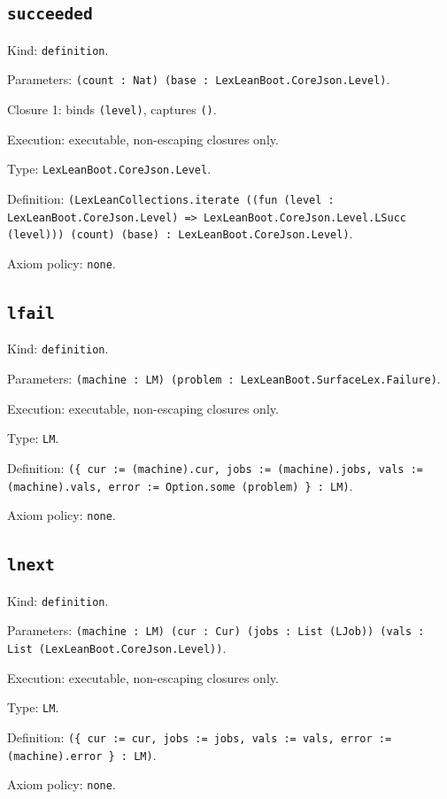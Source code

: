 \documentclass[11pt]{article}
\begin{document}
\subsection*{\texttt{succeeded}}
\noindent Kind: \texttt{definition}.\par
\noindent Parameters: \texttt{(count : Nat) (base : LexLeanBoot.CoreJson.Level)}.\par
\noindent Closure 1: binds \texttt{(level)}, captures \texttt{()}.\par
\noindent Execution: executable, non-escaping closures only.\par
\noindent Type: \texttt{LexLeanBoot.CoreJson.Level}.\par
\noindent Definition: \texttt{(LexLeanCollections.iterate ((fun (level : LexLeanBoot.CoreJson.Level) => LexLeanBoot.CoreJson.Level.LSucc (level))) (count) (base) : LexLeanBoot.CoreJson.Level)}.\par
\noindent Axiom policy: \texttt{none}.\par
\subsection*{\texttt{lfail}}
\noindent Kind: \texttt{definition}.\par
\noindent Parameters: \texttt{(machine : LM) (problem : LexLeanBoot.SurfaceLex.Failure)}.\par
\noindent Execution: executable, non-escaping closures only.\par
\noindent Type: \texttt{LM}.\par
\noindent Definition: \texttt{(\{ cur := (machine).cur, jobs := (machine).jobs, vals := (machine).vals, error := Option.some (problem) \} : LM)}.\par
\noindent Axiom policy: \texttt{none}.\par
\subsection*{\texttt{lnext}}
\noindent Kind: \texttt{definition}.\par
\noindent Parameters: \texttt{(machine : LM) (cur : Cur) (jobs : List (LJob)) (vals : List (LexLeanBoot.CoreJson.Level))}.\par
\noindent Execution: executable, non-escaping closures only.\par
\noindent Type: \texttt{LM}.\par
\noindent Definition: \texttt{(\{ cur := cur, jobs := jobs, vals := vals, error := (machine).error \} : LM)}.\par
\noindent Axiom policy: \texttt{none}.\par
\end{document}
